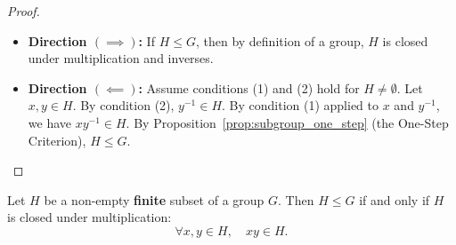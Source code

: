 \begin{proof}
\begin{itemize}[leftmargin=1.5em, itemsep=6pt]
    \item \textbf{Direction $(\implies)$:} If $H \le G$, then by definition of a group, $H$ is closed under multiplication and inverses.
    \item \textbf{Direction $(\impliedby)$:} Assume conditions (1) and (2) hold for $H \ne \emptyset$.
    Let $x, y \in H$. By condition (2), $y^{-1} \in H$.
    By condition (1) applied to $x$ and $y^{-1}$, we have $xy^{-1} \in H$.
    By Proposition~\ref{prop:subgroup_one_step} (the One-Step Criterion), $H \le G$.
\end{itemize}
\end{proof}

\begin{proposition}
\label{prop:finite_subgroup}
Let $H$ be a non-empty \textbf{finite} subset of a group $G$. Then $H \le G$ if and only if $H$ is closed under multiplication:
\begin{equation}
\forall x, y \in H, \quad xy \in H.
\end{equation}
\end{proposition}

